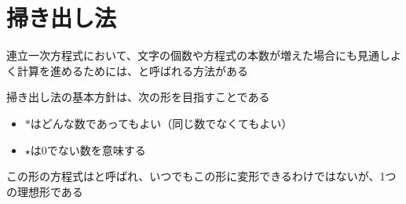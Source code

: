 \documentclass[../../../topic_linear-algebra]{subfiles}
\begin{document}
\sectionline
\section{掃き出し法}

連立一次方程式において、文字の個数や方程式の本数が増えた場合にも見通しよく計算を進めるためには、と呼ばれる方法がある

\br

掃き出し法の基本方針は、次の形を目指すことである

\begin{center}
\end{center}

\begin{itemize}
  \item $*$はどんな数であってもよい（同じ数でなくてもよい）
  \item $\star$は0でない数を意味する
\end{itemize}

この形の方程式はと呼ばれ、いつでもこの形に変形できるわけではないが、1つの理想形である
\end{document}
